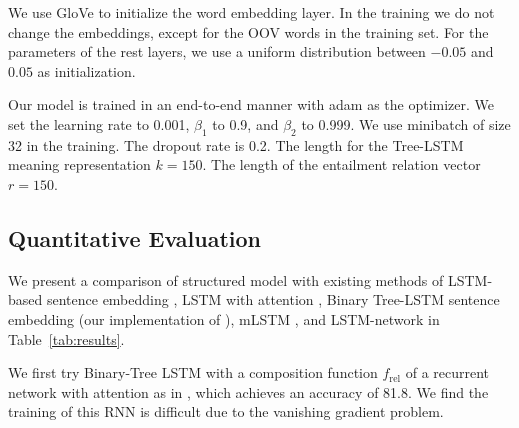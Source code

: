 


We use GloVe \cite{pennington2014glove} to initialize the 
word embedding layer. In the training we do not change the embeddings,
except for the OOV words in the training set.
For the parameters of the rest layers,
we use a uniform distribution between $-0.05$ and $0.05$
as initialization.

Our model is trained in an end-to-end manner with adam \cite{kingma2014adam} as the optimizer.
We set the learning rate to 0.001, $\beta_1$ to 0.9,
and $\beta_2$ to 0.999.
We use minibatch of size 32 in the training.
The dropout rate is 0.2.
The length for the Tree-LSTM meaning representation
$k=150$. The length of the entailment relation
vector $r=150$.

\subsection{Quantitative Evaluation}




We present a comparison of structured model with existing methods
of LSTM-based sentence embedding \cite{bowman2015large},
LSTM with attention \cite{rocktaschel2015reasoning},
Binary Tree-LSTM sentence embedding (our implementation
of ),
mLSTM \cite{wang2015learning},
and LSTM-network \cite{cheng2016long} 
in Table~\ref{tab:results}.


We first try Binary-Tree LSTM with a composition function
$f_{\text{rel}}$ of a 
recurrent network with attention as 
in ,
which achieves an accuracy of 81.8.
We find the training of this RNN is difficult due
to the vanishing gradient problem.

